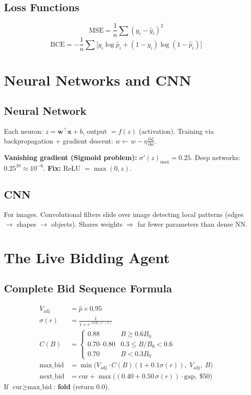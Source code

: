\documentclass[12pt,a4paper]{article}
\begin{document}
\subsection{Loss Functions}
\begin{formulabox}
\[\text{MSE}=\frac{1}{n}\sum(y_i-\hat{y}_i)^2\]
\[\text{BCE}=-\frac{1}{n}\sum\bigl[y_i\log\hat{p}_i+(1-y_i)\log(1-\hat{p}_i)\bigr]\]
\end{formulabox}

\section{Neural Networks and CNN}

\subsection{Neural Network}
Each neuron: $z=\mathbf{w}^\top\mathbf{x}+b$, output $=f(z)$ (activation).
Training via backpropagation + gradient descent: $w\leftarrow w-\eta\frac{\partial\mathcal{L}}{\partial w}$.

\textbf{Vanishing gradient (Sigmoid problem):} $\sigma'(z)_{\max}=0.25$. Deep networks: $0.25^{10}\approx10^{-6}$. \textbf{Fix:} ReLU $=\max(0,z)$.

\subsection{CNN}
For images. Convolutional filters slide over image detecting local patterns (edges $\rightarrow$ shapes $\rightarrow$ objects). Shares weights $\Rightarrow$ far fewer parameters than dense NN.

\section{The Live Bidding Agent}

\subsection{Complete Bid Sequence Formula}
\begin{formulabox}
\begin{align*}
  V_{\text{adj}}&=\hat{p}\times0.95\\
  \sigma(r)&=\frac{1}{1+e^{-0.35(r-5)}}\\
  C(B)&=\begin{cases}0.88&B\geq0.6B_0\\0.70\text{--}0.80&0.3\leq B/B_0<0.6\\0.70&B<0.3B_0\end{cases}\\
  \text{max\_bid}&=\min\!\bigl(V_{\text{adj}}\cdot C(B)(1+0.1\sigma(r)),\;V_{\text{adj}},\;B\bigr)\\
  \text{next\_bid}&=\text{cur}+\max\!\bigl((0.40+0.50\,\sigma(r))\cdot\text{gap},\;\$50\bigr)
\end{align*}
If $\text{cur}\geq\text{max\_bid}$: \textbf{fold} (return 0.0).
\end{formulabox}
\end{document}
